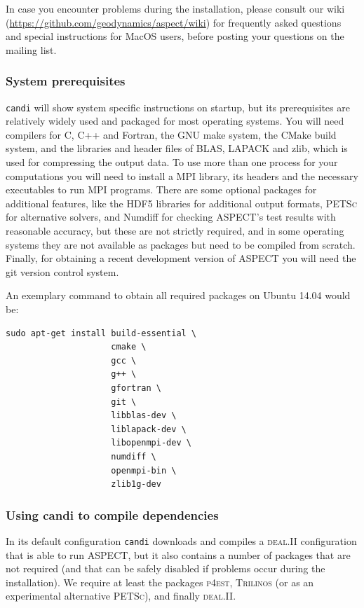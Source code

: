\documentclass{article}
\newcommand{\dealii}{{\textsc{deal.II}}}
\newcommand{\pfrst}{{\normalfont\textsc{p4est}}}
\newcommand{\trilinos}{{\textsc{Trilinos}}}
\newcommand{\petsc}{{\textsc{PETSc}}}
\newcommand{\aspect}{\textsc{ASPECT}}
\begin{document}
In case you encounter problems during the installation, please consult our wiki
(\url{https://github.com/geodynamics/aspect/wiki}) for frequently asked
questions and special instructions for MacOS users, before posting your
questions on the mailing list.

\subsubsection{System prerequisites}

\texttt{candi} will show system specific instructions on startup, but its prerequisites
are relatively widely used and packaged
for most operating systems. You will need compilers for C, C++ and
Fortran, the GNU make system, the CMake build system, and the libraries and
header files of BLAS, LAPACK and zlib, which is used for compressing
the output data. To use more than one process for your computations
you will need to install a MPI library, its headers and the
necessary executables to run MPI programs. There are some optional packages
for additional features, like the HDF5 libraries for additional output formats,
\petsc{} for alternative solvers, and Numdiff for checking \aspect{}'s test
results with reasonable accuracy, but these are not strictly required, and in
some operating systems they are not available as packages but need to be
compiled from scratch.
Finally, for obtaining a recent development version of \aspect{} you will
need the git version control system.

An exemplary command to obtain all required packages on Ubuntu 14.04 would be:
\begin{verbatim}
sudo apt-get install build-essential \
                     cmake \
                     gcc \
                     g++ \
                     gfortran \
                     git \
                     libblas-dev \
                     liblapack-dev \
                     libopenmpi-dev \
                     numdiff \
                     openmpi-bin \
                     zlib1g-dev
\end{verbatim}

\subsubsection{Using candi to compile dependencies}

In its default configuration \texttt{candi} downloads and
compiles a \dealii{} configuration that is able to run \aspect, but it
also contains a number of packages that are not required (and that can
be safely disabled if problems occur during the
installation). We require at least the packages \pfrst{}, \trilinos{} 
(or as an experimental alternative \petsc{}), and finally \dealii{}.
 
\end{document}

